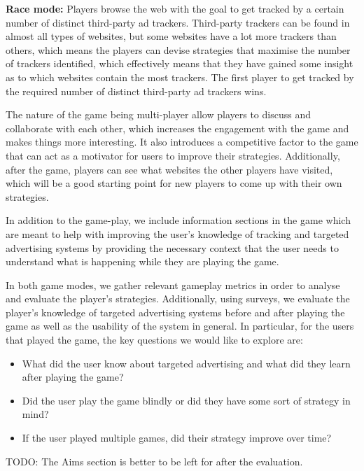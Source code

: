 \documentclass{l4proj}
\begin{document}
\textbf{Race mode:} Players browse the web with the goal to get tracked by a certain number of distinct third-party ad trackers. Third-party trackers can be found in almost all types of websites, but some websites have a lot more trackers than others, which means the players can devise strategies that maximise the number of trackers identified, which effectively means that they have gained some insight as to which websites contain the most trackers. The first player to get tracked by the required number of distinct third-party ad trackers wins.

The nature of the game being multi-player allow players to discuss and collaborate with each other, which increases the engagement with the game and makes things more interesting. It also introduces a competitive factor to the game that can act as a motivator for users to improve their strategies.  Additionally, after the game, players can see what websites the other players have visited, which will be a good starting point for new players to come up with their own strategies.

In addition to the game-play, we include information sections in the game which are meant to help with improving the user's knowledge of tracking and targeted advertising systems by providing the necessary context that the user needs to understand what is happening while they are playing the game.     

In both game modes, we gather relevant gameplay metrics in order to analyse and evaluate the player's strategies. Additionally, using surveys, we evaluate the player's knowledge of targeted advertising systems before and after playing the game as well as the usability of the system in general. In particular, for the users that played the game, the key questions we would like to explore are:
\begin{itemize}
    \item
    What did the user know about targeted advertising and what did they learn after playing the game?
    \item
    Did the user play the game blindly or did they have some sort of strategy in mind?
    \item
    If the user played multiple games, did their strategy improve over time?
\end{itemize}
TODO: The Aims section is better to be left for after the evaluation. 
\end{document}

